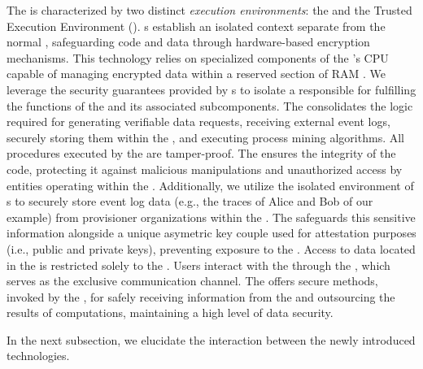 The  is characterized by two distinct \textit{execution environments}: the  and the Trusted Execution Environment (). s establish an isolated context separate from the normal , safeguarding code and data through hardware-based encryption mechanisms. This technology relies on specialized components of the 's CPU capable of managing encrypted data within a reserved section of RAM \cite{TEEHERE}. We leverage the security guarantees provided by s to isolate a  responsible for fulfilling the functions of the  and its associated subcomponents. The  consolidates the logic required for generating verifiable data requests, receiving external event logs, securely storing them within the , and executing process mining algorithms. All procedures executed by the  are tamper-proof. The  ensures the integrity of the  code, protecting it against malicious manipulations and unauthorized access by entities operating within the . Additionally, we utilize the isolated environment of s to securely store event log data (e.g., the traces of Alice and Bob of our example) from provisioner organizations within the . The  safeguards this sensitive information alongside a unique asymetric key couple used for attestation purposes (i.e., public and private keys), preventing exposure to the . Access to data located in the  is restricted solely to the . Users interact with the  through the , which serves as the exclusive communication channel. The  offers secure methods, invoked by the , for safely receiving information from the  and outsourcing the results of computations, maintaining a high level of data security.

In the next subsection, we elucidate the interaction between the newly introduced technologies.

